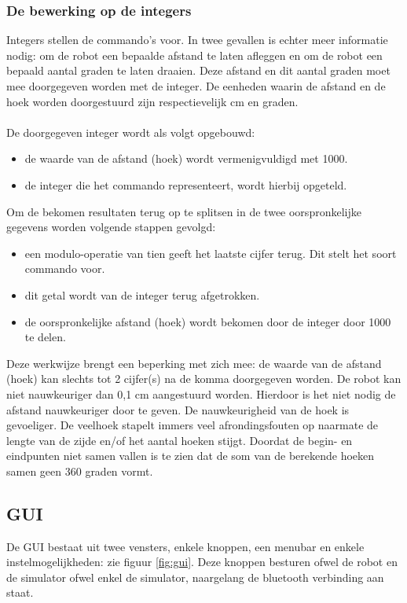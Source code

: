 \documentclass[tt3]{penoverslag}
\begin{document}
\subsubsection{De bewerking op de integers} %
\label{sssec:integer}
Integers stellen de commando's voor. In twee gevallen is echter meer informatie nodig: om de robot een bepaalde afstand te laten afleggen en om de robot een bepaald aantal graden te laten draaien. Deze afstand en dit aantal graden moet mee doorgegeven worden met de integer. De eenheden waarin de afstand en de hoek worden doorgestuurd zijn respectievelijk cm en graden.\\\\
De doorgegeven integer wordt als volgt opgebouwd:

\begin{itemize}
\item de waarde van de afstand (hoek) wordt vermenigvuldigd met 1000.
\item de integer die het commando representeert, wordt hierbij opgeteld.
\end{itemize}

Om de bekomen resultaten terug op te splitsen in de twee oorspronkelijke gegevens worden volgende stappen gevolgd:

\begin{itemize}
\item een modulo-operatie van tien geeft het laatste cijfer terug. Dit stelt het soort commando voor.
\item dit getal wordt van de integer terug afgetrokken.
\item de oorspronkelijke afstand (hoek) wordt bekomen door de integer door 1000 te delen.
\end{itemize}

Deze werkwijze brengt een beperking met zich mee: de waarde van de afstand (hoek) kan slechts tot 2 cijfer(s) na de komma doorgegeven worden. De robot kan niet nauwkeuriger dan 0,1 cm aangestuurd worden. Hierdoor is het niet nodig de afstand nauwkeuriger door te geven. De nauwkeurigheid van de hoek is gevoeliger. De veelhoek stapelt immers veel afrondingsfouten op naarmate de lengte van de zijde en/of het aantal hoeken stijgt. Doordat de begin- en eindpunten niet samen vallen is te zien dat de som van de berekende hoeken samen geen 360 graden vormt. 

\subsection{GUI} %
\label{ssec:GUI}
De GUI bestaat uit twee vensters, enkele knoppen, een menubar en enkele instelmogelijkheden: zie figuur \ref{fig:gui}. Deze knoppen besturen ofwel de robot en de simulator ofwel enkel de simulator, naargelang de bluetooth verbinding aan staat.\\
\end{document}
